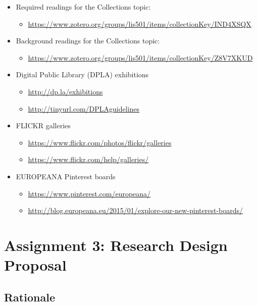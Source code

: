 \documentclass[]{article}
\providecommand{\tightlist}{%
  \setlength{\itemsep}{0pt}\setlength{\parskip}{0pt}}
\begin{document}
\begin{itemize}
\tightlist
\item
  Required readings for the Collections topic:

  \begin{itemize}
  \tightlist
  \item
    \url{https://www.zotero.org/groups/lis501/items/collectionKey/IND4XSQX}
  \end{itemize}
\item
  Background readings for the Collections topic:

  \begin{itemize}
  \tightlist
  \item
    \url{https://www.zotero.org/groups/lis501/items/collectionKey/Z8V7XKUD}\\
  \end{itemize}
\item
  Digital Public Library (DPLA) exhibitions

  \begin{itemize}
  \tightlist
  \item
    \url{http://dp.la/exhibitions}
  \item
    \url{http://tinyurl.com/DPLAguidelines}
  \end{itemize}
\item
  FLICKR galleries

  \begin{itemize}
  \tightlist
  \item
    \url{https://www.flickr.com/photos/flickr/galleries}
  \item
    \url{https://www.flickr.com/help/galleries/}
  \end{itemize}
\item
  EUROPEANA Pinterest boards

  \begin{itemize}
  \tightlist
  \item
    \url{https://www.pinterest.com/europeana/}
  \item
    \url{http://blog.europeana.eu/2015/01/explore-our-new-pinterest-boards/}
  \end{itemize}
\end{itemize}

\section{Assignment 3: Research Design Proposal}\label{Asgt3}

\subsection{Rationale}\label{rationale-2}
\end{document}
